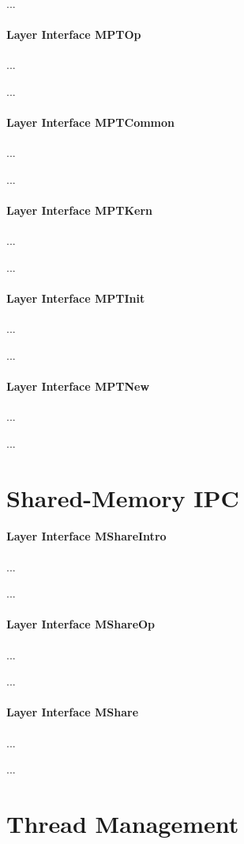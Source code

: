 ...

\paragraph{Layer Interface MPTOp}
...

...

\paragraph{Layer Interface MPTCommon}
...

...

\paragraph{Layer Interface MPTKern}
...

...

\paragraph{Layer Interface MPTInit}
...

...

\paragraph{Layer Interface MPTNew}
...

...

\section{Shared-Memory IPC}

\paragraph{Layer Interface MShareIntro}
...

...

\paragraph{Layer Interface MShareOp}
...

...

\paragraph{Layer Interface MShare}
...

...

\section{Thread Management}

